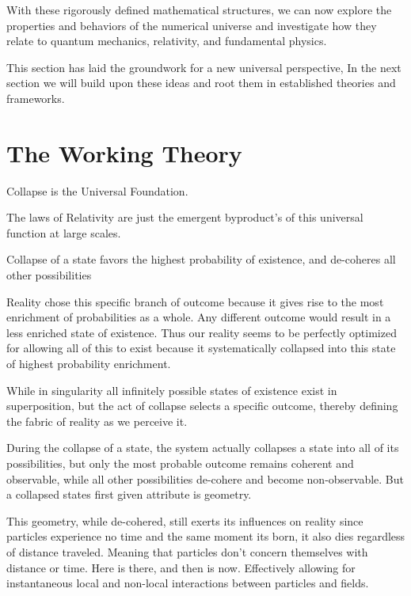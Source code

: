 \documentclass[11pt]{article}
\newcommand{\headertext}{}
\begin{document}
        With these rigorously defined mathematical structures, we can now explore the properties and behaviors of the numerical universe and investigate how they relate to quantum mechanics, relativity, and fundamental physics.

        This section has laid the groundwork for a new universal perspective,
        In the next section we will build upon these ideas and root them in established theories and frameworks.
\newpage

\section{The Working Theory}
    \renewcommand{\headertext}{(TECH: PoPE)\hspace{1em} SS-4: \hspace{1em}The Working Theory}

    Collapse is the Universal Foundation.

    The laws of Relativity are just the emergent byproduct's of this universal function at large scales.

    Collapse of a state favors the highest probability of existence, and de-coheres all other possibilities

    Reality chose this specific branch of outcome because it gives rise to the most enrichment of probabilities as a whole.
    Any different outcome would result in a less enriched state of existence.
    Thus our reality seems to be perfectly optimized for allowing all of this to exist because it systematically collapsed into this state of highest probability enrichment.

    While in singularity all infinitely possible states of existence exist in superposition,
    but the act of collapse selects a specific outcome, thereby defining the fabric of reality as we perceive it.

    During the collapse of a state, the system actually collapses a state into all of its possibilities,
    but only the most probable outcome remains coherent and observable, while all other possibilities de-cohere and become non-observable.
    But a collapsed states first given attribute is geometry.

    This geometry, while de-cohered, still exerts its influences on reality since particles experience no time and the same moment its born, it also dies regardless of distance traveled.
    Meaning that particles don't concern themselves with distance or time. Here is there, and then is now.
    Effectively allowing for instantaneous local and non-local interactions between particles and fields.
\end{document}
